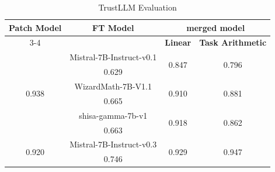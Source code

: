 \documentclass[conference,compsoc]{IEEEtran}
\begin{document}

\begin{table}[h]
\centering
\caption{TrustLLM Evaluation}
\label{tab:trustllm}
\begin{tabular}{c|c|cc}
\hline \hline
\multirow{2}{*}{\textbf{Patch Model}} & \multirow{2}{*}{\textbf{FT Model}} & \multicolumn{2}{c}{\textbf{merged model}}          \\ 
\cline{3-4} 
 &  & \multicolumn{1}{c|}{\textbf{Linear}} & \textbf{Task Arithmetic} \\ 
\hline
\multirow{6}{*}{0.938}       & Mistral-7B-Instruct-v0.1  & \multicolumn{1}{c|}{\multirow{2}{*}{0.847}} & \multirow{2}{*}{0.796} \\
                             & 0.629                     & \multicolumn{1}{c|}{}                      &                        \\ 
\cline{2-4} 
                             & WizardMath-7B-V1.1        & \multicolumn{1}{c|}{\multirow{2}{*}{0.910}} & \multirow{2}{*}{0.881} \\
                             & 0.665                     & \multicolumn{1}{c|}{}                      &                        \\ 
\cline{2-4} 
                             & shisa-gamma-7b-v1         & \multicolumn{1}{c|}{\multirow{2}{*}{0.918}} & \multirow{2}{*}{0.862} \\
                             & 0.663                     & \multicolumn{1}{c|}{}                      &                        \\ 
\hline
\multirow{2}{*}{0.920}       & Mistral-7B-Instruct-v0.3  & \multicolumn{1}{c|}{\multirow{2}{*}{0.929}} & \multirow{2}{*}{0.947} \\
                             & 0.746                    & \multicolumn{1}{c|}{}                      &                        \\ 
\hline \hline
\end{tabular}
\end{table}
\end{document}
